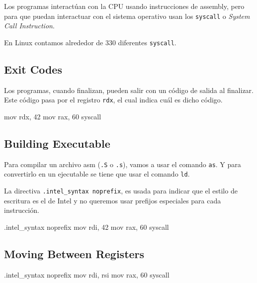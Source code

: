 Los programas interactúan con la CPU usando instrucciones de assembly,
pero para que puedan interactuar con el sistema operativo usan
los \texttt{syscall} o \textit{System Call Instruction}.

En Linux contamos alrededor de 330 diferentes \texttt{syscall}.

\subsection{Exit Codes}\label{subsec:exit_codes}

Los programas, cuando finalizan, pueden salir con un código de salida al
finalizar.
Este código pasa por el registro \texttt{rdx}, el cual indica cuál es dicho
código.

\begin{codebox}[ASM]{}
	mov rdx, 42
	mov rax, 60
	syscall
\end{codebox}

\subsection{Building Executable}\label{subsec:building_executable}

Para compilar un archivo asm (\texttt{.S} o \texttt{.s}), vamos a usar el comando \texttt{as}.
Y para convertirlo en un ejecutable se tiene que usar el comando \texttt{ld}.

La directiva \texttt{.intel_syntax noprefix}, es usada para indicar que el estilo
de escritura es el de Intel y no queremos usar prefijos especiales para cada
instrucción.

\begin{codebox}[ASM]{}
	.intel_syntax noprefix
	mov rdi, 42
	mov rax, 60
	syscall
\end{codebox}

\subsection{Moving Between Registers}\label{subsec:moving_between_registers}

\begin{codebox}[ASM]{}
	.intel_syntax noprefix
	mov rdi, rsi
	mov rax, 60
	syscall
\end{codebox}
